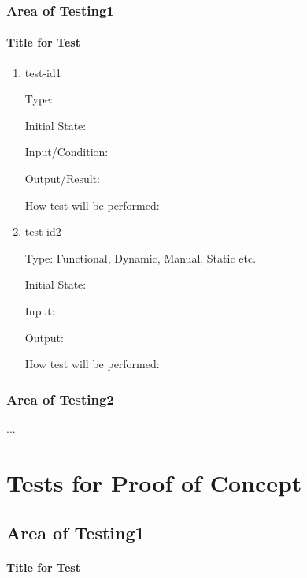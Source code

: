 \documentclass[12pt, titlepage]{article}
\begin{document}
\subsubsection{Area of Testing1}
		
\paragraph{Title for Test}

\begin{enumerate}

\item{test-id1\\}

Type: 
					
Initial State: 
					
Input/Condition: 
					
Output/Result: 
					
How test will be performed: 
					
\item{test-id2\\}

Type: Functional, Dynamic, Manual, Static etc.
					
Initial State: 
					
Input: 
					
Output: 
					
How test will be performed: 

\end{enumerate}

\subsubsection{Area of Testing2}

...

\section{Tests for Proof of Concept}

\subsection{Area of Testing1}
		
\paragraph{Title for Test}
\end{document}
